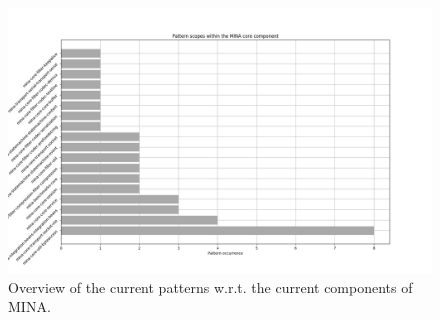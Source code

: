 \begin{landscape}
\begin{figure}
    \centering
    \includegraphics[scale = 0.6]{images/graphs/core_scopes.png}
    \caption{Overview of the current patterns w.r.t. the current components of MINA.}
    \label{fig:mina_core_scope}
\end{figure}
\end{landscape}